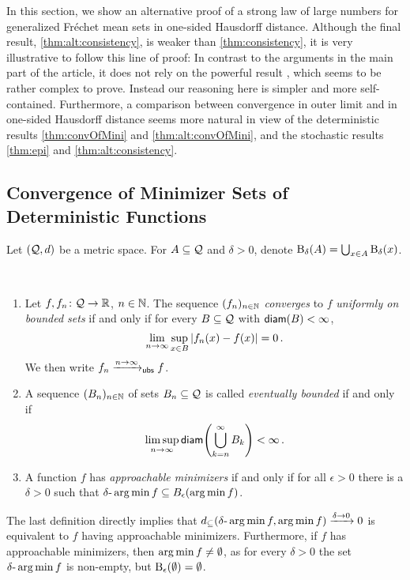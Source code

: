 In this section, we show an alternative proof of a strong law of large numbers for generalized Fréchet mean sets in one-sided Hausdorff distance. Although the final result, \autoref{thm:alt:consistency}, is weaker than \autoref{thm:consistency}, it is very illustrative to follow this line of proof:
In contrast to the arguments in the main part of the article, it does not rely on the powerful result \cite[Theorem 1.1]{korf01}, which seems to be rather complex to prove. Instead our reasoning here is simpler and more self-contained.
Furthermore, a comparison between convergence in outer limit and in one-sided Hausdorff distance seems more natural in view of the deterministic results \autoref{thm:convOfMini} and \autoref{thm:alt:convOfMini}, and the stochastic results \autoref{thm:epi} and \autoref{thm:alt:consistency}.
%
%
\subsection{Convergence of Minimizer Sets of Deterministic Functions}\label{ssec:alt:det}
%
Let $(\mathcal{Q}, d)$ be a metric space. For $A\subseteq \mathcal{Q}$ and $\delta>0$, denote $\operatorname{\mathrm{B}}_\delta(A) = \bigcup_{x\in A} \operatorname{\mathrm{B}}_\delta(x)$. 
%
\begin{definition} \mbox{ }
	\begin{enumerate}[label=(\roman*)]
	\item 
		Let $f,f_n \colon \mathcal{Q}\to\mathbb{R}$, $n\in\mathbb{N}$.
		The sequence $(f_n)_{n\in\mathbb{N}}$  \emph{converges} to $f$ \emph{uniformly on bounded sets} if and only if for every $B\subseteq \mathcal{Q}$ with $\operatorname{\mathsf{diam}}(B)<\infty$,
		\begin{equation*}
		\lim_{n\to\infty} \sup_{x\in B}\left| f_n(x) - f(x) \right| =0
		\, .
		\end{equation*}
		We then write $f_n\xrightarrow{n\to\infty}_{\mathsf{ubs}} f$.
	\item 
		A sequence $(B_n)_{n\in\mathbb{N}}$ of sets $B_n \subseteq \mathcal{Q}$ is called \emph{eventually bounded} if and only if
		\begin{equation*}
		\limsup_{n\to\infty} \operatorname{\mathsf{diam}}\!\left( \bigcup_{k=n}^\infty B_k \right) < \infty
		\, .
		\end{equation*}
	\item 
		A function $f$ has \emph{approachable minimizers} if and only if for all $\epsilon >0$ there is a $\delta>0$ such that
		$\delta\text{-}\operatorname*{arg\,min} f \subseteq B_\epsilon(\operatorname*{arg\,min} f)$.
	\end{enumerate}	
\end{definition}
%
The last definition directly implies that $d_\subseteq(\delta\text{-}\operatorname*{arg\,min} f, \operatorname*{arg\,min} f) \xrightarrow{\delta\to0} 0$ is equivalent to $f$ having approachable minimizers. Furthermore, if $f$ has approachable minimizers, then $\operatorname*{arg\,min} f \neq \emptyset$, as for every $\delta>0$ the set $\delta\text{-}\operatorname*{arg\,min} f$ is non-empty, but $\operatorname{\mathrm{B}}_\epsilon(\emptyset)=\emptyset$.
